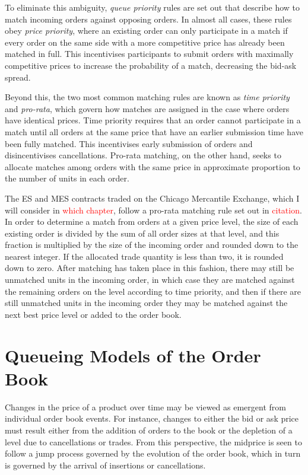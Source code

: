 \documentclass[honours,12pt]{unswthesis}
\numberwithin{equation}{section}
\begin{document}
To eliminate this ambiguity, \textit{queue priority} rules are set out that describe how to match incoming orders against opposing orders. In almost all cases, these rules obey \textit{price priority}, where an existing order can only participate in a match if every order on the same side with a more competitive price has already been matched in full. This incentivises participants to submit orders with maximally competitive prices to increase the probability of a match, decreasing the bid-ask spread.

Beyond this, the two most common matching rules are known as \textit{time priority} and \textit{pro-rata}, which govern how matches are assigned in the case where orders have identical prices. Time priority requires that an order cannot participate in a match until all orders at the same price that have an earlier submission time have been fully matched. This incentivises early submission of orders and disincentivises cancellations. Pro-rata matching, on the other hand, seeks to allocate matches among orders with the same price in approximate proportion to the number of units in each order.

The ES and MES contracts traded on the Chicago Mercantile Exchange, which I will consider in \textcolor{red}{which chapter}, follow a pro-rata matching rule set out in \textcolor{red}{citation}. In order to determine a match from orders at a given price level, the size of each existing order is divided by the sum of all order sizes at that level, and this fraction is multiplied by the size of the incoming order and rounded down to the nearest integer. If the allocated trade quantity is less than two, it is rounded down to zero. After matching has taken place in this fashion, there may still be unmatched units in the incoming order, in which case they are matched against the remaining orders on the level according to time priority, and then if there are still unmatched units in the incoming order they may be matched against the next best price level or added to the order book.


\section{Queueing Models of the Order Book}
Changes in the price of a product over time may be viewed as emergent from individual order book events. For instance, changes to either the bid or ask price must result either from the addition of orders to the book or the depletion of a level due to cancellations or trades. From this perspective, the midprice is seen to follow a jump process governed by the evolution of the order book, which in turn is governed by the arrival of insertions or cancellations.
\end{document}

